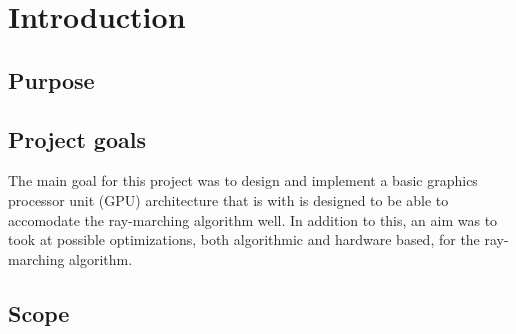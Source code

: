 \chapter{Introduction} 
	
	\section{Purpose}
	
	\section{Project goals}
		
		The main goal for this project was to design and implement a basic
		graphics processor unit (GPU) architecture that is with is designed to
		be able to accomodate the ray-marching algorithm well. In addition to
		this, an aim was to took at possible optimizations, both algorithmic
		and hardware based, for the ray-marching algorithm.
		
	\section{Scope}
